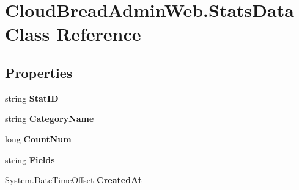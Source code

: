 \hypertarget{class_cloud_bread_admin_web_1_1_stats_data}{}\section{Cloud\+Bread\+Admin\+Web.\+Stats\+Data Class Reference}
\label{class_cloud_bread_admin_web_1_1_stats_data}
\subsection*{Properties}
\begin{DoxyCompactItemize}
\item 
string {\bfseries Stat\+ID}\hypertarget{class_cloud_bread_admin_web_1_1_stats_data_a28ea961a9afea2729d8d2961549466a0}{}\label{class_cloud_bread_admin_web_1_1_stats_data_a28ea961a9afea2729d8d2961549466a0}

\item 
string {\bfseries Category\+Name}\hypertarget{class_cloud_bread_admin_web_1_1_stats_data_ae219e285aded384bc8e8f375cdce17f8}{}\label{class_cloud_bread_admin_web_1_1_stats_data_ae219e285aded384bc8e8f375cdce17f8}

\item 
long {\bfseries Count\+Num}\hypertarget{class_cloud_bread_admin_web_1_1_stats_data_ab033b6a3e7c6e0d0ef5ce7963caee4d1}{}\label{class_cloud_bread_admin_web_1_1_stats_data_ab033b6a3e7c6e0d0ef5ce7963caee4d1}

\item 
string {\bfseries Fields}\hypertarget{class_cloud_bread_admin_web_1_1_stats_data_a905c2cf818c788b1d7650b5fb675fdb8}{}\label{class_cloud_bread_admin_web_1_1_stats_data_a905c2cf818c788b1d7650b5fb675fdb8}

\item 
System.\+Date\+Time\+Offset {\bfseries Created\+At}\hypertarget{class_cloud_bread_admin_web_1_1_stats_data_a83dce5e4717d976155ca61d77eff34ed}{}\label{class_cloud_bread_admin_web_1_1_stats_data_a83dce5e4717d976155ca61d77eff34ed}


\end{DoxyCompactItemize}
